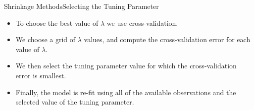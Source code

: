 \begin{frame}{Shrinkage Methods}{Selecting the Tuning Parameter}
    \begin{itemize}
    \item To choose the best value of $\lambda$ we use cross-validation. \pause 
    
    \item We choose a grid of $\lambda$ values, and compute the cross-validation error for each value of $\lambda$. \pause

    \item We then select the tuning parameter value for which the cross-validation error is smallest. \pause 

    \item Finally, the model is re-fit using all of the available observations and the selected value of the tuning parameter.
\end{itemize}
\end{frame}